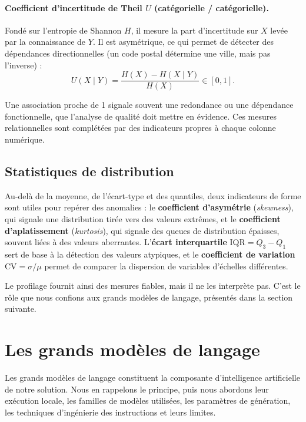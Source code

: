 \paragraph{Coefficient d'incertitude de Theil $U$ (catégorielle / catégorielle).} Fondé sur l'entropie de Shannon $H$, il mesure la part d'incertitude sur $X$ levée par la connaissance de $Y$. Il est asymétrique, ce qui permet de détecter des dépendances directionnelles (un code postal détermine une ville, mais pas l'inverse) :
\begin{equation}
U(X \mid Y) = \frac{H(X) - H(X \mid Y)}{H(X)} \in [0, 1].
\end{equation}

Une association proche de 1 signale souvent une redondance ou une dépendance fonctionnelle, que l'analyse de qualité doit mettre en évidence. Ces mesures relationnelles sont complétées par des indicateurs propres à chaque colonne numérique.

\subsection{Statistiques de distribution}

Au-delà de la moyenne, de l'écart-type et des quantiles, deux indicateurs de forme sont utiles pour repérer des anomalies : le \textbf{coefficient d'asymétrie} (\textit{skewness}), qui signale une distribution tirée vers des valeurs extrêmes, et le \textbf{coefficient d'aplatissement} (\textit{kurtosis}), qui signale des queues de distribution épaisses, souvent liées à des valeurs aberrantes. L'\textbf{écart interquartile} $\text{IQR} = Q_3 - Q_1$ sert de base à la détection des valeurs atypiques, et le \textbf{coefficient de variation} $\text{CV} = \sigma / \mu$ permet de comparer la dispersion de variables d'échelles différentes.

Le profilage fournit ainsi des mesures fiables, mais il ne les interprète pas. C'est le rôle que nous confions aux grands modèles de langage, présentés dans la section suivante.

\section{Les grands modèles de langage}

Les grands modèles de langage constituent la composante d'intelligence artificielle de notre solution. Nous en rappelons le principe, puis nous abordons leur exécution locale, les familles de modèles utilisées, les paramètres de génération, les techniques d'ingénierie des instructions et leurs limites.

